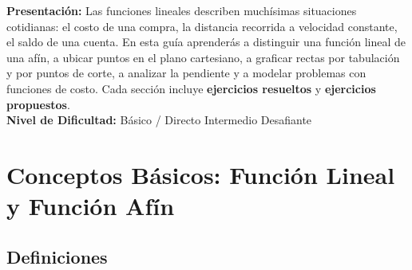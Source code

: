 \documentclass[12pt, letterpaper]{article}
\begin{document}


\vspace{4pt}
\begin{cuadroinfo}
  \small
  \textbf{Presentación:} Las funciones lineales describen muchísimas situaciones cotidianas: el costo de una compra, la distancia recorrida a velocidad constante, el saldo de una cuenta. En esta guía aprenderás a distinguir una función lineal de una afín, a ubicar puntos en el plano cartesiano, a graficar rectas por tabulación y por puntos de corte, a analizar la pendiente y a modelar problemas con funciones de costo. Cada sección incluye \textbf{ejercicios resueltos} y \textbf{ejercicios propuestos}.
  \\[4pt]
  \textbf{Nivel de Dificultad:}\quad
  \facil{} Básico / Directo \quad
  \medio{} Intermedio \quad
  \dificil{} Desafiante
\end{cuadroinfo}

\vspace{8pt}

\section{Conceptos Básicos: Función Lineal y Función Afín}

\subsection{Definiciones}
\end{document}
